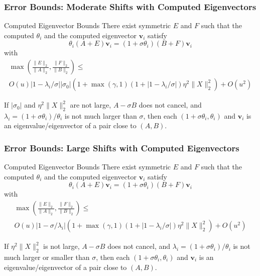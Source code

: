 \documentclass[landscape]{beamer}
\renewcommand{\vec}[1]{\bm{#1}}
\begin{document}
\begin{frame}
  \frametitle{Error Bounds: Moderate Shifts with Computed Eigenvectors}

  \begin{block}{Computed Eigenvector Bounds}
    There exist symmetric
    $E$ and $F$ such that the computed $\theta_i$ and the computed
    eigenvector $\vec{v}_i$ satisfy
    \begin{equation*}
      \theta_i (A+E) \vec{v}_i = (1+\sigma \theta_i) (B+F) \vec{v}_i
    \end{equation*}
    with
    \begin{multline*}
      \max\left(\frac{\|E\|_2}{\|A\|_2}, \frac{\|F\|_2}{\|B\|_2}\right) \leq \\
      O(u) |1-\lambda_i/\sigma| |\sigma_0| \left(1 + \max(\gamma,1)
      \left(1+ |1-\lambda_i/\sigma|\right)\eta^2\|X\|_2^2\right) +O(u^2)
    \end{multline*}
  \end{block}
  
  If $|\sigma_0|$ and $\eta^2 \|X\|_2^2$ are not large, $A-\sigma B$
  does not cancel, and $\lambda_i = (1+\sigma\theta_i)/\theta_i$ is
  not much larger than $\sigma$, then each
  $(1+\sigma \theta_i, \theta_i)$ and $\vec{v}_i$ is an
  eigenvalue/eigenvector of a pair close to $(A,B)$.
\end{frame}

\begin{frame}
  \frametitle{Error Bounds: Large Shifts with Computed Eigenvectors}

  \begin{block}{Computed Eigenvector Bounds}
    There exist symmetric $E$ and $F$ such that the computed
    $\theta_i$ and the computed eigenvector $\vec{v}_i$ satisfy
    \begin{equation*}
      \theta_i (A+E) \vec{v}_i = (1+\sigma \theta_i) (B+F) \vec{v}_i
    \end{equation*}
    with
    \begin{multline*}
      \max\left(\frac{\|E\|_2}{\|A\|_2}, \frac{\|F\|_2}{\|B\|_2}\right) \leq  \\
      O(u) |1-\sigma/\lambda_i| \left(1 + \max(\gamma,1)
      \left(1+ |1-\lambda_i/\sigma|\right)\eta^2\|X\|_2^2\right) + O(u^2)
    \end{multline*}
  \end{block}
  If $\eta^2 \|X\|_2^2$ is not large, $A-\sigma B$ does not cancel,
  and $\lambda_i = (1+\sigma\theta_i)/\theta_i$ is not much larger or
  smaller than $\sigma$, then each $(1+\sigma \theta_i, \theta_i)$ and
  $\vec{v}_i$ is an eigenvalue/eigenvector of a pair close to $(A,B)$.
\end{frame}
\end{document}
